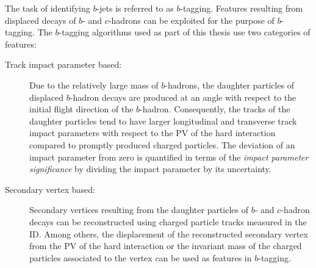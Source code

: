 The task of identifying $b$-jets is referred to as $b$-tagging. Features
resulting from displaced decays of $b$- and $c$-hadrons can be exploited for the
purpose of $b$-tagging. The $b$-tagging algorithms used as part of this thesis
use two categories of features:
\begin{description}

\item[Track impact parameter based:] Due to the relatively large mass of
  $b$-hadrons, the daughter particles of displaced $b$-hadron decays are
  produced at an angle with respect to the initial flight direction of the
  $b$-hadron. Consequently, the tracks of the daughter particles tend to have
  larger longitudinal and transverse track impact parameters with respect to the
  PV of the hard interaction compared to promptly produced charged
  particles. The deviation of an impact parameter from zero is quantified in
  terms of the \emph{impact parameter significance} by dividing the impact
  parameter by its uncertainty.

\item[Secondary vertex based:] Secondary vertices resulting from the daughter
  particles of $b$- and $c$-hadron decays can be reconstructed using charged
  particle tracks measured in the ID. Among others, the displacement of the
  reconstructed secondary vertex from the PV of the hard interaction or the
  invariant mass of the charged particles associated to the vertex can be used
  as features in $b$-tagging.

\end{description}

